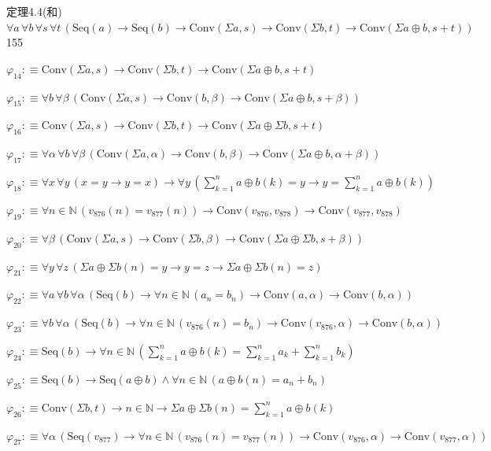 \begin{fullproof}{定理4.4(和)}{$\forall a\,\forall b\,\forall s\,\forall t\,(\mathrm{Seq}(a) \to \mathrm{Seq}(b) \to \mathrm{Conv}(\Sigma a,s) \to \mathrm{Conv}(\Sigma b,t) \to \mathrm{Conv}(\Sigma a \oplus b,s + t))$}{155}
\begin{abbrevlist}
\item $\varphi_{14} :\equiv \mathrm{Conv}(\Sigma a,s) \to \mathrm{Conv}(\Sigma b,t) \to \mathrm{Conv}(\Sigma a \oplus b,s + t)$
\item $\varphi_{15} :\equiv \forall b\,\forall \beta\,(\mathrm{Conv}(\Sigma a,s) \to \mathrm{Conv}(b,\beta) \to \mathrm{Conv}(\Sigma a \oplus b,s + \beta))$
\item $\varphi_{16} :\equiv \mathrm{Conv}(\Sigma a,s) \to \mathrm{Conv}(\Sigma b,t) \to \mathrm{Conv}(\Sigma a \oplus \Sigma b,s + t)$
\item $\varphi_{17} :\equiv \forall \alpha\,\forall b\,\forall \beta\,(\mathrm{Conv}(\Sigma a,\alpha) \to \mathrm{Conv}(b,\beta) \to \mathrm{Conv}(\Sigma a \oplus b,\alpha + \beta))$
\item $\varphi_{18} :\equiv \forall x\,\forall y\,(x = y \to y = x) \to \forall y\,({\textstyle\sum_{k=1}^{n} a \oplus b(k)} = y \to y = {\textstyle\sum_{k=1}^{n} a \oplus b(k)})$
\item $\varphi_{19} :\equiv \forall n \in \mathbb{N}\,(v_{876}(n) = v_{877}(n)) \to \mathrm{Conv}(v_{876},v_{878}) \to \mathrm{Conv}(v_{877},v_{878})$
\item $\varphi_{20} :\equiv \forall \beta\,(\mathrm{Conv}(\Sigma a,s) \to \mathrm{Conv}(\Sigma b,\beta) \to \mathrm{Conv}(\Sigma a \oplus \Sigma b,s + \beta))$
\item $\varphi_{21} :\equiv \forall y\,\forall z\,(\Sigma a \oplus \Sigma b(n) = y \to y = z \to \Sigma a \oplus \Sigma b(n) = z)$
\item $\varphi_{22} :\equiv \forall a\,\forall b\,\forall \alpha\,(\mathrm{Seq}(b) \to \forall n \in \mathbb{N}\,(a_{n} = b_{n}) \to \mathrm{Conv}(a,\alpha) \to \mathrm{Conv}(b,\alpha))$
\item $\varphi_{23} :\equiv \forall b\,\forall \alpha\,(\mathrm{Seq}(b) \to \forall n \in \mathbb{N}\,(v_{876}(n) = b_{n}) \to \mathrm{Conv}(v_{876},\alpha) \to \mathrm{Conv}(b,\alpha))$
\item $\varphi_{24} :\equiv \mathrm{Seq}(b) \to \forall n \in \mathbb{N}\,({\textstyle\sum_{k=1}^{n} a \oplus b(k)} = {\textstyle\sum_{k=1}^{n} a_{k}} + {\textstyle\sum_{k=1}^{n} b_{k}})$
\item $\varphi_{25} :\equiv \mathrm{Seq}(b) \to \mathrm{Seq}(a \oplus b) \land \forall n \in \mathbb{N}\,(a \oplus b(n) = a_{n} + b_{n})$
\item $\varphi_{26} :\equiv \mathrm{Conv}(\Sigma b,t) \to n \in \mathbb{N} \to \Sigma a \oplus \Sigma b(n) = {\textstyle\sum_{k=1}^{n} a \oplus b(k)}$
\item $\varphi_{27} :\equiv \forall \alpha\,(\mathrm{Seq}(v_{877}) \to \forall n \in \mathbb{N}\,(v_{876}(n) = v_{877}(n)) \to \mathrm{Conv}(v_{876},\alpha) \to \mathrm{Conv}(v_{877},\alpha))$

\end{abbrevlist}
\end{fullproof}
